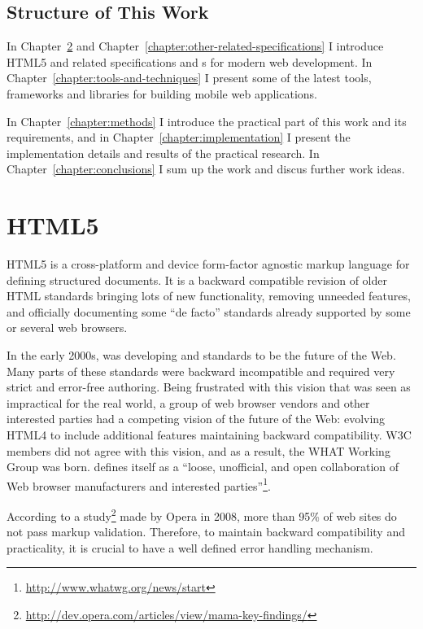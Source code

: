 \section{Structure of This Work}
\label{section:structure-of-this-work}

In Chapter~\ref{chapter:html5} and
Chapter~\ref{chapter:other-related-specifications} I introduce HTML5
and related specifications and s for modern web
development. In Chapter~\ref{chapter:tools-and-techniques} I present
some of the latest tools, frameworks and libraries for building mobile
web applications.

In Chapter~\ref{chapter:methods} I introduce the practical part of
this work and its requirements, and in
Chapter~\ref{chapter:implementation} I present the implementation
details and results of the practical research. In
Chapter~\ref{chapter:conclusions} I sum up the work and discus further
work ideas.

\chapter{HTML5}
\label{chapter:html5}

HTML5 is a cross-platform and device form-factor agnostic markup
language for defining structured documents. It is a backward
compatible revision of older HTML standards bringing lots of new
functionality, removing unneeded features, and officially documenting
some ``de facto'' standards already supported by some or several web
browsers. \cite{pilgrim2010html5}

In the early 2000s,  was developing  and
 standards to be the future of the Web. Many parts of
these standards were backward incompatible and required very strict
and error-free authoring. Being frustrated with this vision that was
seen as impractical for the real world, a group of web browser vendors
and other interested parties had a competing vision of the future of
the Web: evolving HTML4 to include additional features maintaining
backward compatibility. W3C members did not agree with this vision,
and as a result, the WHAT Working Group was born. 
defines itself as a ``loose, unofficial, and open collaboration of Web
browser manufacturers and interested
parties''\footnote{\url{http://www.whatwg.org/news/start}}. \cite{pilgrim2010html5}

According to a
study\footnote{\url{http://dev.opera.com/articles/view/mama-key-findings/}}
made by Opera in 2008, more than 95\% of web sites do not pass markup
validation. Therefore, to maintain backward compatibility and
practicality, it is crucial to have a well defined error handling
mechanism.

